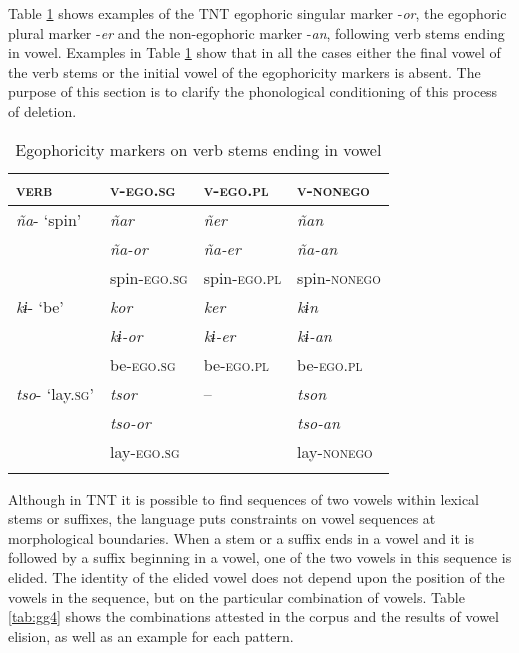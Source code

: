 \documentclass[output=paper]{langsci/langscibook}
\begin{document}
Table \ref{tab:gg3} shows examples of the TNT egophoric singular marker -\textit{or}, the egophoric plural marker -\textit{er} and the non-egophoric marker -\textit{an}, following verb stems ending in vowel. Examples in Table \ref{tab:gg3} show that in all the cases either the final vowel of the verb stems or the initial vowel of the egophoricity markers is absent. The purpose of this section is to clarify the phonological conditioning of this process of deletion. 

\begin{table}
\begin{tabularx}{\textwidth}{XXXX}
\lsptoprule
\textsc{verb} & \textsc{v-ego.sg} & \textsc{v-ego.pl} & \textsc{v-nonego}\\
\midrule
\textit{ña}- ‘spin’ & \textit{ñar} & \textit{ñer} & \textit{ñan}\\
& \textit{ña-or} & \textit{ña-er} & \textit{ña-an}\\
& spin-\textsc{ego.sg} & spin-\textsc{ego.pl} & spin-\textsc{nonego}\\
\textit{kɨ}- ‘be’ & \textit{kor} & \textit{ker} & \textit{kɨn}\\
& \textit{kɨ-or} & \textit{kɨ-er} & \textit{kɨ-an}\\
& be-\textsc{ego.sg} & be-\textsc{ego.pl} & be-\textsc{ego.pl}\\
\textit{tso}- ‘lay.\textsc{sg}’ &  \textit{tsor} & – & \textit{tson}\\
& \textit{tso-or} & & \textit{tso-an}\\
& lay-\textsc{ego.sg} & & lay-\textsc{nonego}\\
\lspbottomrule
\end{tabularx}
\caption{Egophoricity markers on verb stems ending in vowel}
\label{tab:gg3}
\end{table}


Although in TNT it is possible to find sequences of two vowels within lexical stems or suffixes, the language puts constraints on vowel sequences at morphological boundaries. When a stem or a suffix ends in a vowel and it is followed by a suffix beginning in a vowel, one of the two vowels in this sequence is elided. The identity of the elided vowel does not depend upon the position of the vowels in the sequence, but on the particular combination of vowels. Table \ref{tab:gg4} shows the combinations attested in the corpus and the results of vowel elision, as well as an example for each pattern.
\end{document}

